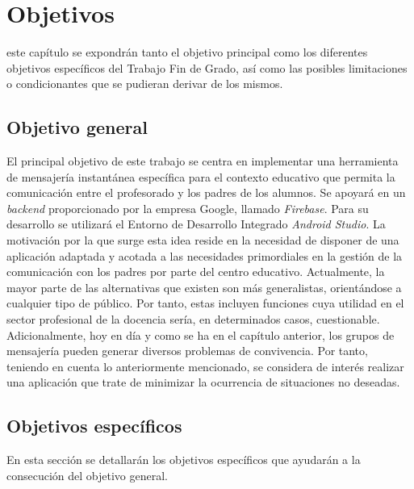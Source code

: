 \chapter{Objetivos}
\label{chap:objetivos}

\noindent

 este capítulo se expondrán tanto el objetivo principal como los diferentes objetivos específicos del Trabajo Fin de Grado, así como las posibles limitaciones o condicionantes que se pudieran derivar de los mismos.

\section{Objetivo general}
El principal objetivo de este trabajo se centra en implementar una herramienta de mensajería instantánea específica para el contexto educativo que permita la comunicación entre el profesorado y los padres de los alumnos. Se apoyará en un \textit{backend} proporcionado por la empresa Google, llamado \textit{Firebase}. Para su desarrollo se utilizará el Entorno de Desarrollo Integrado \textit{Android Studio}. La motivación por la que surge esta idea reside en la necesidad de disponer de una aplicación adaptada y acotada a las necesidades primordiales en la gestión de la comunicación con los padres por parte del centro educativo. Actualmente, la mayor parte de las alternativas que existen son más generalistas, orientándose a cualquier tipo de público. Por tanto, estas incluyen funciones cuya utilidad en el sector profesional de la docencia sería, en determinados casos, cuestionable. Adicionalmente, hoy en día y como se ha en el capítulo anterior, los grupos de mensajería pueden generar diversos problemas de convivencia. Por tanto, teniendo en cuenta lo anteriormente mencionado, se considera de interés realizar una aplicación que trate de minimizar la ocurrencia de situaciones no deseadas.

\section{Objetivos específicos}
En esta sección se detallarán los objetivos específicos que ayudarán a la consecución del objetivo general.

\newpage

